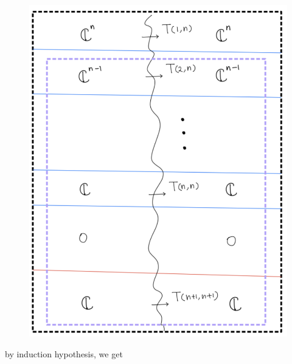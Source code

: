 \begin{enumerate}[label=(\roman*)]
\begin{enumerate}[label=(Step \arabic*)]
\begin{figure}[H]
    \centering
    \includegraphics[scale = 0.95]{diagrams/cobord6/4.png}
    \caption{}
    \label{fig:your-label}
\end{figure}
\pagebreak 
by induction hypothesis, we get


\end{enumerate}
\end{enumerate}
